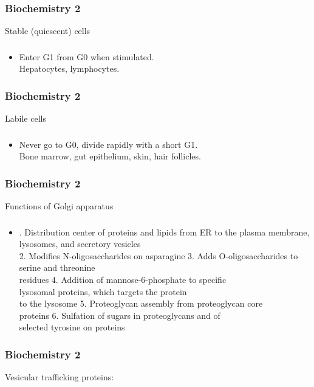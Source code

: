\documentclass[11pt]{beamer}
\begin{document}
\begin{frame}
 \frametitle{Biochemistry 2}
Stable (quiescent) cells
\end{frame}

\begin{frame}
 \frametitle{}
\begin{itemize}
\item Enter G1 from G0 when stimulated. \\ Hepatocytes, lymphocytes.
\end{itemize}
\end{frame}

\begin{frame}
 \frametitle{Biochemistry 2}
Labile cells
\end{frame}

\begin{frame}
 \frametitle{}
\begin{itemize}
\item Never go to G0, divide rapidly with a short G1. \\ Bone marrow, gut epithelium, skin, hair follicles.
\end{itemize}
\end{frame}

\begin{frame}
 \frametitle{Biochemistry 2}
Functions of Golgi apparatus
\end{frame}

\begin{frame}
 \frametitle{}
\begin{itemize}
\item . Distribution center of proteins and lipids from ER to the plasma membrane, lysosomes, and secretory vesicles \\ 2. Modifies N-oligosaccharides on asparagine 3. Adds O-oligosaccharides to serine and threonine \\ residues 4. Addition of mannose-6-phosphate to specific \\ lysosomal proteins, which targets the protein \\ to the lysosome 5. Proteoglycan assembly from proteoglycan core \\ proteins 6. Sulfation of sugars in proteoglycans and of \\ selected tyrosine on proteins
\end{itemize}
\end{frame}

\begin{frame}
 \frametitle{Biochemistry 2}
Vesicular trafficking proteins:
\end{frame}
\end{document}
